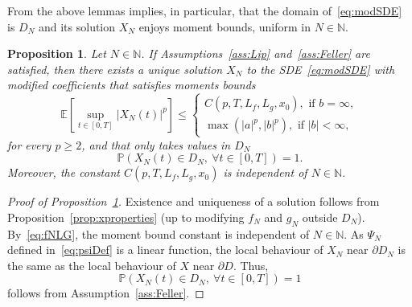\documentclass[11pt]{amsart}
\newtheorem{proposition}[theorem]{Proposition}
\newcommand{\E}{{\mathbb E}}
\newcommand{\PP}{{\mathbb P}}
\newcommand{\DDN}{D_{N}}
\begin{document}
{From the above lemmas implies, in particular, that the domain of~\eqref{eq:modSDE} is $\DDN$ and its solution $X_{N}$ enjoys moment bounds, uniform in $N \in \mathbb{N}$.
\begin{proposition}\label{prop:xNproperties}
Let $N \in \mathbb{N}$. If Assumptions~\ref{ass:Lip} and~\ref{ass:Feller} are satisfied, then there exists a unique solution $X_{N}$ to the SDE~\eqref{eq:modSDE} with modified coefficients that satisfies moments bounds
\begin{equation*}
\E \left[ \sup_{t \in [0,T]} |X_{N}(t)|^{p} \right] \leq 
\begin{cases}
C(p,T,L_{f},L_{g},x_{0}), \text{ if } b = \infty,\\
\max(|a|^{p},|b|^{p}), \text{ if } |b| < \infty,
\end{cases}
\end{equation*}
for every $p \geq 2$, and that only takes values in $\DDN$
\begin{equation*}
\PP \left( X_{N}(t) \in \DDN,\ \forall t \in [0,T] \right)= 1.
\end{equation*}
Moreover, the constant $C(p,T,L_{f},L_{g},x_{0})$ is independent of $N \in \mathbb{N}$.
\end{proposition}
\begin{proof}[Proof of Proposition~\ref{prop:xNproperties}]
Existence and uniqueness of a solution follows from Proposition~\ref{prop:xproperties} (up to modifying $f_{N}$ and $g_{N}$ outside $\DDN$). By~\eqref{eq:fNLG}, the moment bound constant is independent of $N \in \mathbb{N}$. As $\Psi_{N}$ defined in~\eqref{eq:psiDef} is a linear function, the local behaviour of $X_{N}$ near $\partial \DDN$ is the same as the local behaviour of $X$ near $\partial D$. Thus, 
\begin{equation*}
\PP \left( X_{N}(t) \in \DDN,\ \forall t \in [0,T] \right)= 1
\end{equation*}
follows from Assumption~\ref{ass:Feller}.
\end{proof}

}
\end{document}
